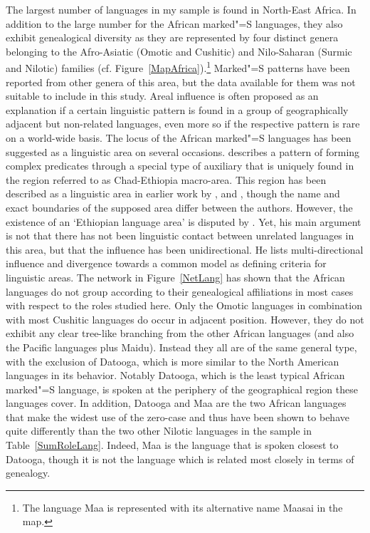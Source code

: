 The largest number of languages in my sample is found in North-East Africa. 
In addition to the large number for the African marked"=S languages, they also exhibit genealogical diversity as they are represented by four distinct genera belonging to the Afro-Asiatic (Omotic and Cushitic) and Nilo-Saharan (Surmic and Nilotic) families (cf. Figure~\vref{MapAfrica}).\footnote{The language Maa is represented with its alternative name Maasai in the map.} 
Marked"=S patterns have been reported from other genera of this area, but the data available for them was not suitable to include in this study. 
Areal influence is often proposed as an explanation if a certain linguistic pattern is found in a group of geographically adjacent but non-related languages, even more so if the respective pattern is rare on a world-wide basis.
The locus of the African marked"=S languages has been suggested as a linguistic area on several occasions.
\citet{Gueldemann:2005} describes a pattern of forming complex predicates through a special type of auxiliary that is uniquely found in the region referred to as Chad-Ethiopia macro-area. 
This region has been described as a linguistic area in earlier work by \citet{Greenberg:1983}, \citet{Ferguson:1976} and \citet{Heine:1976}, though the name and exact boundaries of the supposed area differ between the authors.
However, the existence of an `Ethiopian language area' is disputed by \citet{Tosco:2000}. 
Yet, his main argument is not that there has not been linguistic contact between unrelated languages in this area, but that the influence has been unidirectional. 
He lists multi-directional influence and divergence towards a common model as defining criteria for linguistic areas. 
The network in Figure~\ref{NetLang} has shown that the African languages do not group according to their genealogical affiliations in most cases with respect to the roles studied here. 
Only the Omotic languages in combination with most Cushitic languages do occur in adjacent position. 
However, they do not exhibit any clear tree-like branching from the other African languages (and also the Pacific languages plus Maidu). %
Instead they all are of the same general type, with the exclusion of Datooga, which is more similar to the North American languages in its behavior. 
Notably Datooga, which is the least typical African marked"=S language, is spoken at the periphery of the geographical region these languages cover.
In addition, Datooga and Maa are the two African languages that make the widest use of the zero-case and thus have been shown to behave quite differently than the two other Nilotic languages in the sample in Table~\ref{SumRoleLang}. 
Indeed, Maa is the language that is spoken closest to Datooga, though it is not the language which is related most closely in terms of genealogy. 



